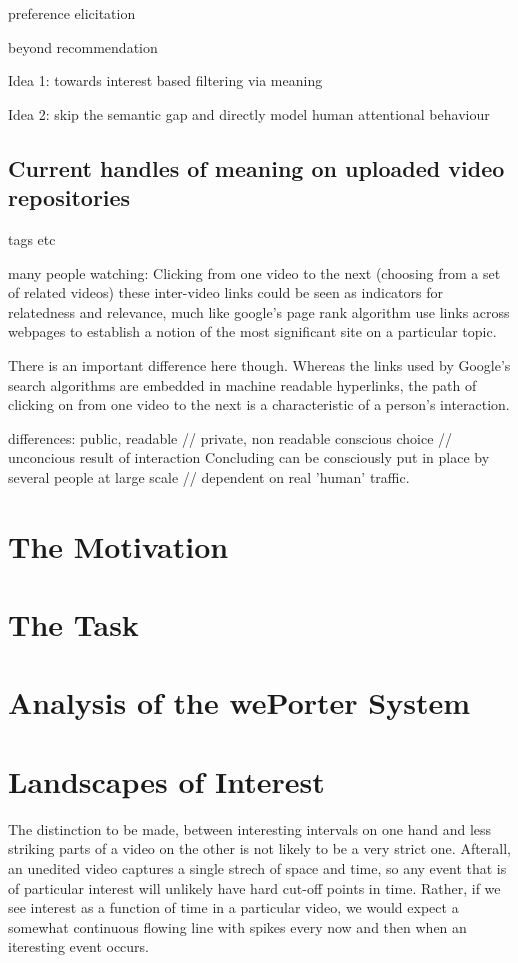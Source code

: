 preference elicitation

beyond recommendation


Idea 1: towards interest based filtering via meaning

Idea 2: skip the semantic gap and directly model human attentional behaviour


\subsection{Current handles of meaning on uploaded video repositories}
tags etc


many people watching:
Clicking from one video to the next (choosing from a set of related videos)
these inter-video links could be seen as indicators for relatedness and relevance, much like google's page rank algorithm use links across webpages to establish a notion of the most significant site on a particular topic. 

There is an important difference here though. Whereas the links used by Google's search algorithms are embedded in machine readable hyperlinks, the path of clicking on from one video to the next is a characteristic of a person's interaction. 

differences:
	public, readable // private, non readable
	conscious choice // unconcious result of interaction
	Concluding
		can be consciously put in place by several people at large scale // dependent on real 'human' traffic.
		

\section{The Motivation}
\section{The Task}


\section{Analysis of the wePorter System}

\section{Landscapes of Interest}

The distinction to be made, between interesting intervals on one hand and less striking parts of a video on the other is not likely to be a very strict one. Afterall, an unedited video captures a single strech of space and time, so any event that is of particular interest will unlikely have hard cut-off points in time. Rather, if we see interest as a function of time in a particular video, we would expect a somewhat continuous flowing line with spikes every now and then when an iteresting event occurs. 

